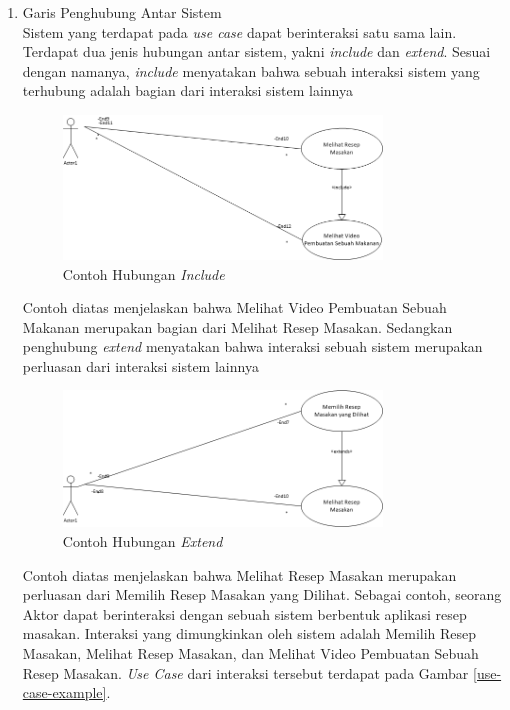 \begin{enumerate}
			\item Garis Penghubung Antar Sistem\\ 
			Sistem yang terdapat pada \textit{use case} dapat berinteraksi satu sama lain. Terdapat dua jenis hubungan antar sistem, yakni \textit{include} dan \textit{extend}. Sesuai dengan namanya, \textit{include} menyatakan bahwa sebuah interaksi sistem yang terhubung adalah bagian dari interaksi sistem lainnya
			\begin{figure}[H]
				\centering
				\includegraphics[width=0.8\textwidth]{gambar/use-case/include}
				\caption{Contoh Hubungan \textit{Include}}
			\end{figure}
			Contoh diatas menjelaskan bahwa Melihat Video Pembuatan Sebuah Makanan merupakan bagian dari Melihat  Resep Masakan. Sedangkan penghubung \textit{extend} menyatakan bahwa interaksi sebuah sistem merupakan perluasan dari interaksi sistem lainnya
			\begin{figure}[H]
				\centering
				\includegraphics[width=0.8\textwidth]{gambar/use-case/extends}
				\caption{Contoh Hubungan \textit{Extend}}
			\end{figure}
			Contoh diatas menjelaskan bahwa Melihat Resep Masakan merupakan perluasan dari Memilih Resep Masakan yang Dilihat. Sebagai contoh, seorang Aktor dapat berinteraksi dengan sebuah sistem berbentuk aplikasi resep masakan. Interaksi yang dimungkinkan oleh sistem adalah Memilih Resep Masakan, Melihat Resep Masakan, dan Melihat Video Pembuatan Sebuah Resep Masakan. \textit{Use Case} dari interaksi tersebut terdapat pada Gambar \ref{use-case-example}.
			\begin{figure}[H]

\end{figure}
\end{enumerate}
